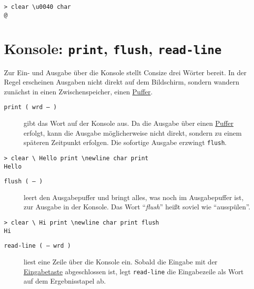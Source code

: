 \begin{verbatim}
> clear \u0040 char
@
\end{verbatim}

\section{Konsole: \texttt{print}, \texttt{flush}, \texttt{read-}\-\texttt{line}}
\label{sec:VM.Konsole}

Zur Ein- und Ausgabe über die Konsole stellt Consize drei Wörter bereit. In der Regel erscheinen Ausgaben nicht direkt auf dem Bildschirm, sondern wandern zunächst in einen Zwischenspeicher, einen \href{http://de.wikipedia.org/wiki/Puffer_(Informatik)}{Puffer}.

\begin{description}
\item[\texttt{print ( wrd -- )}] gibt das Wort auf der Konsole aus. Da die Ausgabe über einen \href{http://de.wikipedia.org/wiki/Puffer\_(Informatik)}{Puffer} erfolgt, kann die Ausgabe möglicherweise nicht direkt, sondern zu einem späteren Zeitpunkt erfolgen. Die sofortige Ausgabe erzwingt \verb|flush|. 
\end{description}

\begin{verbatim}
> clear \ Hello print \newline char print
Hello

\end{verbatim}

\begin{description}
\item[\texttt{flush ( -- )}] leert den Ausgabepuffer und bringt alles, was noch im Ausgabepuffer ist, zur Ausgabe in der Konsole. Das Wort "`\emph{flush}"' heißt soviel wie "`ausspülen"'.
\end{description}

\begin{verbatim}
> clear \ Hi print \newline char print flush
Hi

\end{verbatim}

\begin{description}
\item[\texttt{read-line ( -- wrd )}] liest eine Zeile über die Konsole ein. Sobald die Eingabe mit der \href{http://de.wikipedia.org/wiki/Eingabetaste}{Eingabetaste} abgeschlossen ist, legt \verb|read-line| die Eingabezeile als Wort auf dem Ergebnisstapel ab.
\end{description}

